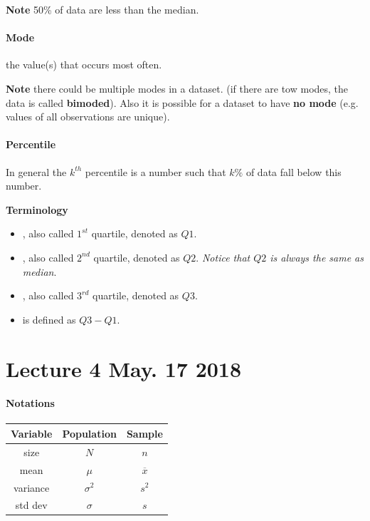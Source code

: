 \documentclass[11pt]{article}
\begin{document}
	\textbf{Note} 50\% of data are less than the median.
	
	\paragraph{Mode} the value(s) that occurs most often.
	
	\textbf{Note} there could be multiple modes in a dataset. (if there are tow modes, the data is called \textbf{bimoded}). Also it is possible for a dataset to have \textbf{no mode} (e.g. values of all observations are unique).
	
	\paragraph{Percentile} In general the $k^{th}$ percentile is a number such that $k\%$ of data fall below this number.
	
	\textbf{Terminology}
	\begin{itemize}
		\item {}, also called $1^{st}$ quartile, denoted as $Q1$.
		\item {}, also called $2^{nd}$ quartile, denoted as $Q2$. \emph{Notice that $Q2$ is always the same as median}.
		\item {}, also called $3^{rd}$ quartile, denoted as $Q3$.
		\item {} is defined as $Q3 - Q1$.
	\end{itemize}
	
\section{Lecture 4 May. 17 2018}
\paragraph{Notations}
\begin{center}
	\begin{tabular}{|c|c|c|}
		\hline
		Variable & Population & Sample \\
		\hline
		\hline
		size & $N$ & $n$ \\
		\hline
		mean & $\mu$ & $\overline{x}$ \\
		\hline
		variance & $\sigma^2$ & $s^2$ \\
		\hline
		std dev & $\sigma$ & $s$ \\
		\hline
	\end{tabular}
\end{center}
\end{document}
